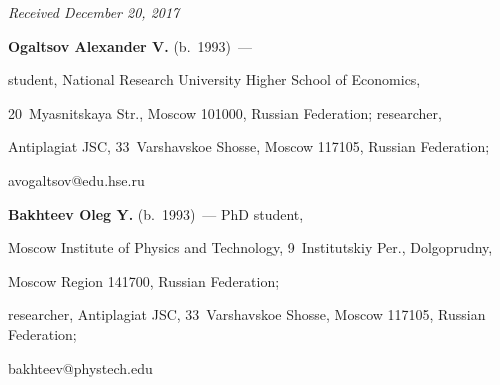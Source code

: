 \vspace*{-3pt}





\hfill{\small\textit{Received December 20, 2017}}







        


\Contr





\noindent


\textbf{Ogaltsov Alexander V.} (b.\ 1993)~--- 


student, National Research University Higher School of Economics, 


20~Myasnitskaya Str., Moscow 101000, Russian Federation; researcher, 


Antiplagiat JSC, 33~Varshavskoe Shosse, Moscow 117105, Russian Federation; 


\mbox{avogaltsov@edu.hse.ru}





\vspace*{3pt}





\noindent


\textbf{Bakhteev  Oleg Y.} (b.\ 1993)~--- PhD student, 


Moscow Institute of Physics and Technology, 9~Institutskiy Per., Dolgoprudny, 


Moscow Region 141700, Russian Federation; 


researcher, Antiplagiat JSC, 33~Varshavskoe Shosse, Moscow 117105, Russian Federation; 


\mbox{bakhteev@phystech.edu}








\label{end\stat}








\renewcommand{\bibname}{\protect\rm Литература} 


